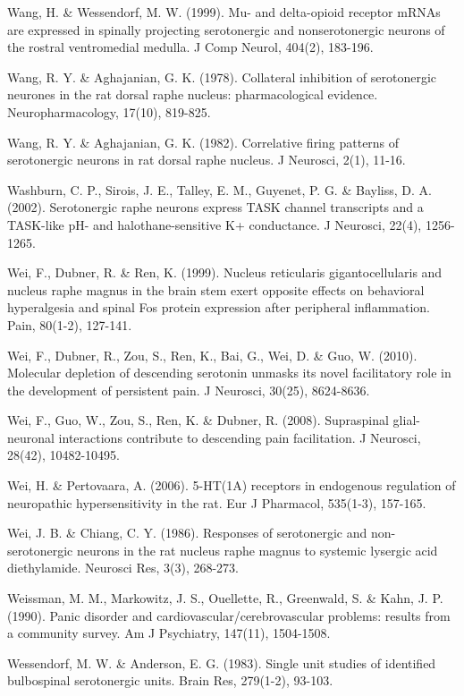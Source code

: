 \documentclass[a4paper,12pt,twoside]{report}
\begin{document}
\begin{singlespacing}
\begin{footnotesize}
Wang, H. \& Wessendorf, M. W. (1999). Mu- and delta-opioid receptor mRNAs are expressed in spinally projecting serotonergic and nonserotonergic neurons of the rostral ventromedial medulla. J Comp Neurol, 404(2), 183-196.

Wang, R. Y. \& Aghajanian, G. K. (1978). Collateral inhibition of serotonergic neurones in the rat dorsal raphe nucleus: pharmacological evidence. Neuropharmacology, 17(10), 819-825.

Wang, R. Y. \& Aghajanian, G. K. (1982). Correlative firing patterns of serotonergic neurons in rat dorsal raphe nucleus. J Neurosci, 2(1), 11-16.

Washburn, C. P., Sirois, J. E., Talley, E. M., Guyenet, P. G. \& Bayliss, D. A. (2002). Serotonergic raphe neurons express TASK channel transcripts and a TASK-like pH- and halothane-sensitive K+ conductance. J Neurosci, 22(4), 1256-1265.

Wei, F., Dubner, R. \& Ren, K. (1999). Nucleus reticularis gigantocellularis and nucleus raphe magnus in the brain stem exert opposite effects on behavioral hyperalgesia and spinal Fos protein expression after peripheral inflammation. Pain, 80(1-2), 127-141.

Wei, F., Dubner, R., Zou, S., Ren, K., Bai, G., Wei, D. \& Guo, W. (2010). Molecular depletion of descending serotonin unmasks its novel facilitatory role in the development of persistent pain. J Neurosci, 30(25), 8624-8636.

Wei, F., Guo, W., Zou, S., Ren, K. \& Dubner, R. (2008). Supraspinal glial-neuronal interactions contribute to descending pain facilitation. J Neurosci, 28(42), 10482-10495.

Wei, H. \& Pertovaara, A. (2006). 5-HT(1A) receptors in endogenous regulation of neuropathic hypersensitivity in the rat. Eur J Pharmacol, 535(1-3), 157-165.

Wei, J. B. \& Chiang, C. Y. (1986). Responses of serotonergic and non-serotonergic neurons in the rat nucleus raphe magnus to systemic lysergic acid diethylamide. Neurosci Res, 3(3), 268-273.

Weissman, M. M., Markowitz, J. S., Ouellette, R., Greenwald, S. \& Kahn, J. P. (1990). Panic disorder and cardiovascular/cerebrovascular problems: results from a community survey. Am J Psychiatry, 147(11), 1504-1508.

Wessendorf, M. W. \& Anderson, E. G. (1983). Single unit studies of identified bulbospinal serotonergic units. Brain Res, 279(1-2), 93-103.


\end{footnotesize}
\end{singlespacing}
\end{document}
